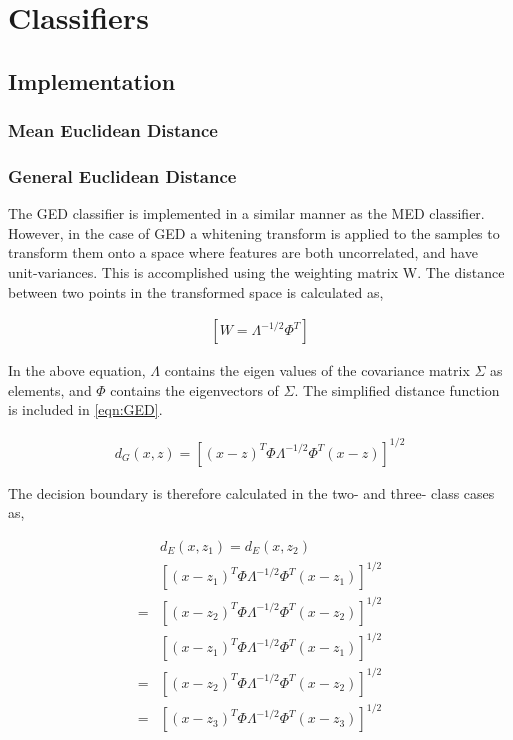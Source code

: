 \section{Classifiers}

\subsection{Implementation}

\subsubsection{Mean Euclidean Distance}

\subsubsection{General Euclidean Distance}
The GED classifier is implemented in a similar manner as the MED classifier. However, in the case of GED a whitening transform is applied to the samples to transform them onto a space where features are both uncorrelated, and have unit-variances. This is accomplished using the weighting matrix W. The distance between two points in the transformed space is calculated as,


\begin{eqnarray}
\label{eqn:GED-whitening}
\left [ W=\Lambda^{-1/2}\Phi^{T}  \right ]
\end{eqnarray}



In the above equation, $\Lambda$ contains the eigen values of the covariance matrix $\Sigma$ as elements, and $\Phi$ contains the eigenvectors of $\Sigma$. The simplified distance function is included in \ref{eqn:GED}.

\begin{eqnarray}
\label{eqn:GED}
{d}_{G}(x,z) = {\left [ (x-z)^{T}\Phi\Lambda^{-1/2}\Phi^{T}(x-z) \right ]}^{1/2}
\end{eqnarray}


The decision boundary is therefore calculated in the two- and three- class cases as,

\begin{eqnarray}
\label{eqn:boundary-GED}
& d_{E} (x,z_{1}) = d_{E} (x,z_{2}) \\
& \left [ (x-{z}_{1})^{T}\Phi\Lambda^{-1/2}\Phi^{T}(x-z_{1}) \right ]^{1/2} \\
= & \left [ (x-z_{2})^{T}\Phi\Lambda^{-1/2}\Phi^{T}(x-z_{2}) \right ]^{1/2}  \nonumber \\
&\left [ (x-{z}_{1})^{T}\Phi\Lambda^{-1/2}\Phi^{T}(x-z_{1}) \right ]^{1/2} \\
= &\left [ (x-z_{2})^{T}\Phi\Lambda^{-1/2}\Phi^{T}(x-z_{2}) \right ]^{1/2}  \nonumber \\
= &\left [ (x-z_{3})^{T}\Phi\Lambda^{-1/2}\Phi^{T}(x-z_{3}) \right ]^{1/2}  \nonumber
\end{eqnarray}



